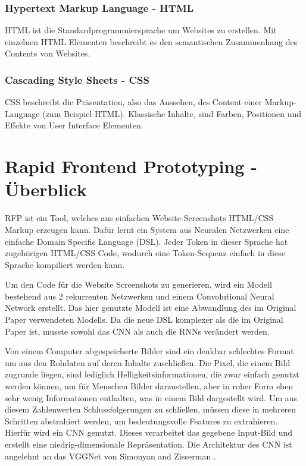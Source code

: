 \documentclass[pdftex,a4paper,halfparskip, article]{scrartcl}
\begin{document}
\subsubsection{Hypertext Markup Language - HTML}
HTML ist die Standardprogrammiersprache um Websites zu erstellen. Mit einzelnen HTML Elementen beschreibt es den semantischen Zusammenhang des Contents von Websites.

\subsubsection{Cascading Style Sheets - CSS}
CSS beschreibt die Präsentation, also das Aussehen, des Content einer Markup-Language (zum Beispiel HTML). Klassische Inhalte, sind Farben, Positionen und Effekte von User Interface Elementen.
 

\section{Rapid Frontend Prototyping - Überblick}\label{sec:rfp}

RFP ist ein Tool, welches aus einfachen Website-Screenshots HTML/CSS Markup erzeugen kann. Dafür lernt ein System aus Neuralen Netzwerken eine einfache Domain Specific Language (DSL). Jeder Token in dieser Sprache hat zugehörigen HTML/CSS Code, wodurch eine Token-Sequenz einfach in diese Sprache kompiliert werden kann.

Um den Code für die Website Screenshots zu generieren, wird ein Modell bestehend aus 2 rekurrenten Netzwerken und einem Convolutional Neural Network erstellt. Das hier genutzte Modell ist eine Abwandlung des im Original Paper verwendeten Modells. Da die neue DSL komplexer als die im Original Paper\cite{Beltramelli17} ist, musste sowohl das CNN als auch die RNNs verändert werden. 

Von einem Computer abgespeicherte Bilder sind ein denkbar schlechtes Format um aus den Rohdaten auf deren Inhalte zuschließen. Die Pixel, die einem Bild zugrunde liegen, sind lediglich Helligkeitsinformationen, die zwar einfach genutzt werden können, um für Menschen Bilder darzustellen, aber in roher Form eben sehr wenig Informationen enthalten, was in einem Bild dargestellt wird. Um aus diesem Zahlenwerten Schlussfolgerungen zu schließen, müssen diese in mehreren Schritten abstrahiert werden, um bedeutungsvolle Features zu extrahieren. Hierfür wird ein CNN genutzt. Dieses verarbeitet das gegebene Input-Bild und erstellt eine niedrig-dimensionale Repräsentation. Die Architektur des CNN ist angelehnt an das VGGNet von Simonyan and Zisserman \cite{DBLP:journals/corr/SimonyanZ14a}.
\end{document}
